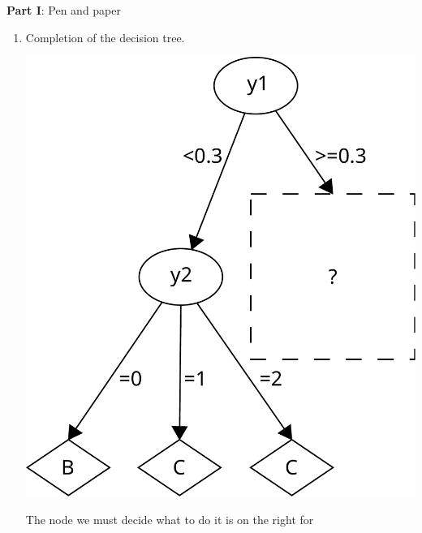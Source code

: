 \documentclass{article}
\begin{document}
\setcounter{page}{0}
\thispagestyle{empty}
\renewcommand{\thesection}{\Roman{section}}

\newpage




\large{\textbf{Part I}: Pen and paper}\normalsize




\begin{enumerate}[leftmargin=\labelsep]
\item Completion of the decision tree.

\hspace{3pt}

\begin{minipage}{0.4\textwidth}
  \includegraphics[scale = 0.3, left]{img/decision_tree_1.pdf}
\end{minipage}
\hspace{0.05\textwidth}
\begin{minipage}{0.6\textwidth}
  The node we must decide what to do it is on the right for 

\end{minipage}
\end{enumerate}
\end{document}
